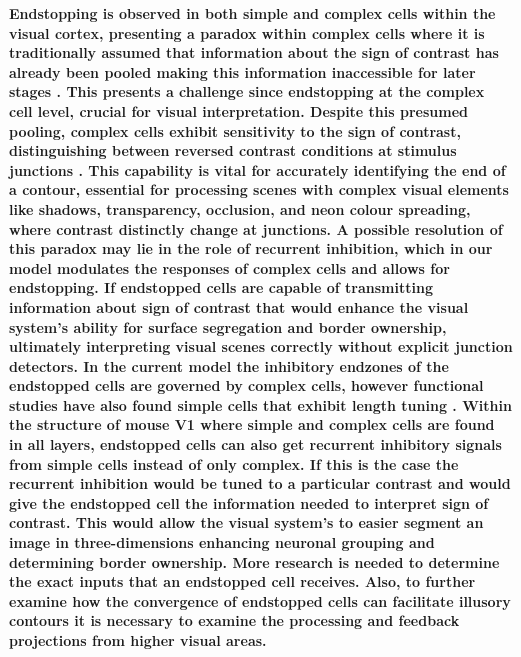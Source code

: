\documentclass[12pt]{article}
\begin{document}
\textbf{ Endstopping is observed in both simple and complex cells within the visual cortex, presenting a paradox within complex cells where it is traditionally assumed that information about the sign of contrast has already been pooled making this information inaccessible for later stages \autocite{yazdanbakhshEndStoppingV12006}. This presents a challenge since endstopping at the complex cell level, crucial for visual interpretation. Despite this presumed pooling, complex cells exhibit sensitivity to the sign of contrast, distinguishing between reversed contrast conditions at stimulus junctions \autocite{yazdanbakhshEndStoppingV12006}. This capability is vital for accurately identifying the end of a contour, essential for processing scenes with complex visual elements like shadows, transparency, occlusion, and neon colour spreading, where contrast distinctly change at junctions. A possible resolution of this paradox may lie in the role of recurrent inhibition, which in our model modulates the responses of complex cells and allows for endstopping. If endstopped cells are capable of transmitting information about sign of contrast that would enhance the visual system's ability for surface segregation and border ownership, ultimately interpreting visual scenes correctly without explicit junction detectors. In the current model the inhibitory endzones of the endstopped cells are governed by complex cells, however functional studies have also found simple cells that exhibit length tuning \autocite{andersonMembranePotentialConductance2001}. Within the structure of mouse V1 where simple and complex cells are found in all layers, endstopped cells can also get recurrent inhibitory signals from simple cells instead of only complex. If this is the case the recurrent inhibition would be tuned to a particular contrast and would give the endstopped cell the information needed to interpret sign of contrast. This would allow the visual system's to easier segment an image in three-dimensions enhancing neuronal grouping and determining border ownership. More research is needed to determine the exact inputs that an endstopped cell receives. Also, to further examine how the convergence of endstopped cells can facilitate illusory contours it is necessary to examine the processing and feedback projections from higher visual areas.}
\end{document}
